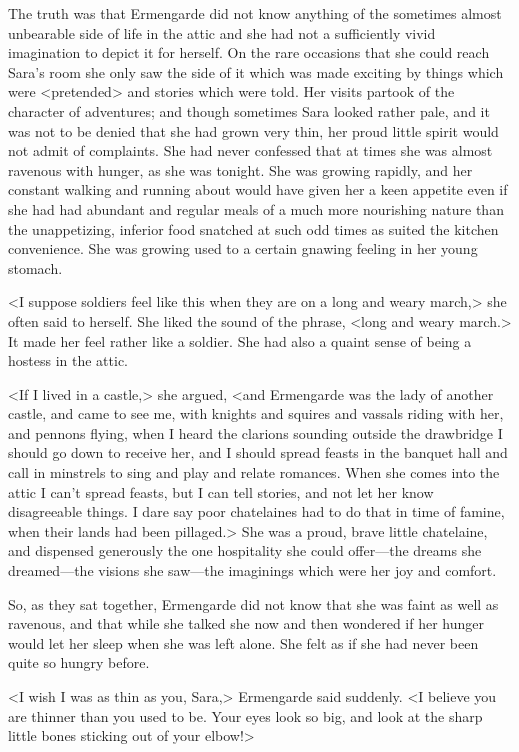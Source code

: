 The truth was that Ermengarde did not know anything of the sometimes almost unbearable side of life in the attic and she had not a sufficiently vivid imagination to depict it for herself. On the rare occasions that she could reach Sara's room she only saw the side of it which was made exciting by things which were <pretended> and stories which were told. Her visits partook of the character of adventures; and though sometimes Sara looked rather pale, and it was not to be denied that she had grown very thin, her proud little spirit would not admit of complaints. She had never confessed that at times she was almost ravenous with hunger, as she was tonight. She was growing rapidly, and her constant walking and running about would have given her a keen appetite even if she had had abundant and regular meals of a much more nourishing nature than the unappetizing, inferior food snatched at such odd times as suited the kitchen convenience. She was growing used to a certain gnawing feeling in her young stomach.

<I suppose soldiers feel like this when they are on a long and weary march,> she often said to herself. She liked the sound of the phrase, <long and weary march.> It made her feel rather like a soldier. She had also a quaint sense of being a hostess in the attic.

<If I lived in a castle,> she argued, <and Ermengarde was the lady of another castle, and came to see me, with knights and squires and vassals riding with her, and pennons flying, when I heard the clarions sounding outside the drawbridge I should go down to receive her, and I should spread feasts in the banquet hall and call in minstrels to sing and play and relate romances. When she comes into the attic I can't spread feasts, but I can tell stories, and not let her know disagreeable things. I dare say poor chatelaines had to do that in time of famine, when their lands had been pillaged.> She was a proud, brave little chatelaine, and dispensed generously the one hospitality she could offer—the dreams she dreamed—the visions she saw—the imaginings which were her joy and comfort.

So, as they sat together, Ermengarde did not know that she was faint as well as ravenous, and that while she talked she now and then wondered if her hunger would let her sleep when she was left alone. She felt as if she had never been quite so hungry before.

<I wish I was as thin as you, Sara,> Ermengarde said suddenly. <I believe you are thinner than you used to be. Your eyes look so big, and look at the sharp little bones sticking out of your elbow!>

